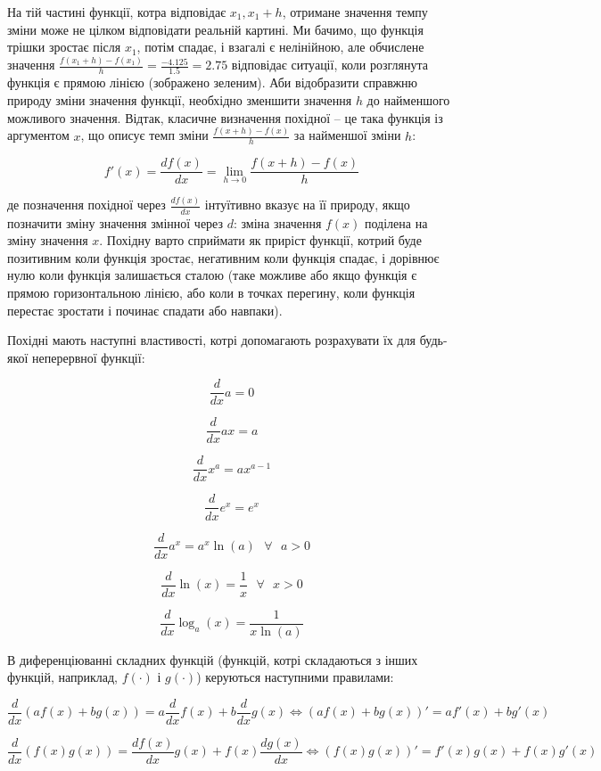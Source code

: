 \documentclass[
  11pt,
]{book}
\begin{document}
На тій частині функції, котра відповідає \(x_1, x_1+h\), отримане
значення темпу зміни може не цілком відповідати реальній картині. Ми
бачимо, що функція трішки зростає після \(x_1\), потім спадає, і взагалі
є нелінійною, але обчислене значення
\(\frac{f(x_1 + h) - f(x_1)}{h} = \frac{-4.125}{1.5} = 2.75\) відповідає
ситуації, коли розглянута функція є прямою лінією (зображено зеленим).
Аби відобразити справжню природу зміни значення функції, необхідно
зменшити значення \(h\) до найменшого можливого значення. Відтак,
класичне визначення похідної -- це така функція із аргументом \(x\), що
описує темп зміни \(\frac{f(x+h) - f(x)}{h}\) за найменшої зміни \(h\):

\[f'(x) = \frac{df(x)}{dx} = \lim\limits_{h \rightarrow 0}\frac{f(x+h) - f(x)}{h}\]

де позначення похідної через \(\frac{df(x)}{dx}\) інтуїтивно вказує на
її природу, якщо позначити зміну значення змінної через \(d\): зміна
значення \(f(x)\) поділена на зміну значення \(x\). Похідну варто
сприймати як приріст функції, котрий буде позитивним коли функція
зростає, негативним коли функція спадає, і дорівнює нулю коли функція
залишається сталою (таке можливе або якщо функція є прямою
горизонтальною лінією, або коли в точках перегину, коли функція перестає
зростати і починає спадати або навпаки).

Похідні мають наступні властивості, котрі допомагають розрахувати їх для
будь-якої неперервної функції:

\[\frac{d}{dx}a = 0\]

\[\frac{d}{dx}ax = a\]

\[\frac{d}{dx} x^a = ax^{a-1}\]

\[\frac{d}{dx} e^x = e^x\]

\[\frac{d}{dx} a^x = a^x \ln (a) \text{ } \forall \text{ } a>0\]

\[\frac{d}{dx} \ln (x) = \frac{1}{x} \text{ } \forall \text{ } x>0\]

\[\frac{d}{dx} \log_a(x) = \frac{1}{x \ln(a)}\]

В диференціюванні складних функцій (функцій, котрі складаються з інших
функцій, наприклад, \(f(\cdot)\) і \(g(\cdot)\)) керуються наступними
правилами:

\[\frac{d}{dx} \left( af(x) + b g(x) \right) = a \frac{d}{dx}f(x) + b \frac{d}{dx}g(x) \iff (af(x) + bg(x))' = af'(x) + bg'(x)\]

\[\frac{d}{dx}(f(x)g(x)) = \frac{df(x)}{dx} g(x) + f(x) \frac{dg(x)}{dx} \iff (f(x)g(x))' = f'(x)g(x) + f(x)g'(x)\]
\end{document}
